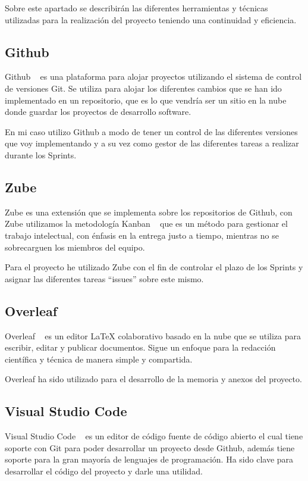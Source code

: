 
Sobre este apartado se describirán las diferentes herramientas y técnicas utilizadas para la realización del proyecto teniendo una continuidad y eficiencia.
\subsection{Github}
Github ~\cite{wiki:GitHub} es una plataforma para alojar proyectos utilizando el sistema de control de versiones Git. Se utiliza para alojar los diferentes cambios que se han ido implementado en un repositorio, que es lo que vendría ser un sitio en la nube donde guardar los proyectos de desarrollo software.

En mi caso utilizo Github a modo de tener un control de las diferentes versiones que voy implementando y a su vez como gestor de las diferentes tareas a realizar durante los Sprints.
\subsection{Zube}
Zube es una extensión que se implementa sobre los repositorios de Github, con Zube utilizamos la metodología Kanban ~\cite{wiki:Kanban} que es un método para gestionar el trabajo intelectual, con énfasis en la entrega justo a tiempo, mientras no se sobrecarguen los miembros del equipo.

Para el proyecto he utilizado Zube con el fin de controlar el plazo de los Sprints y asignar las diferentes tareas “issues” sobre este mismo.
\subsection{Overleaf}
Overleaf ~\cite{wiki:Overleaf} es un editor LaTeX colaborativo basado en la nube que se utiliza para escribir, editar y publicar documentos. Sigue un enfoque para la redacción científica y técnica de manera simple y compartida.

Overleaf ha sido utilizado para el desarrollo de la memoria y anexos del proyecto.
\subsection{Visual Studio Code} 
Visual Studio Code ~\cite{wiki:VSC} es un editor de código fuente de código abierto el cual tiene soporte con Git para poder desarrollar un proyecto desde Github, además tiene soporte para la gran mayoría de lenguajes de programación.
Ha sido clave para desarrollar el código del proyecto y darle una utilidad.
